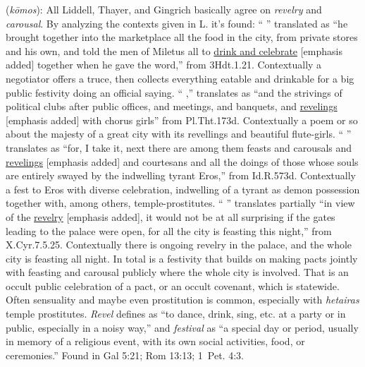 \item[Revel,]

(\textit{kōmos}):
All Liddell, Thayer, and Gingrich basically agree on \emph{revelry} and \emph{carousal}. By analyzing the contexts given in L. it's found: `` \underline{} '' translated as ``he brought together into the marketplace all the food in the city, from private stores and his own, and told the men of Miletus all to \underline{drink and celebrate} [emphasis added] together when he gave the word,'' from 3Hdt.1.21. Contextually a negotiator offers a truce, then collects everything eatable and drinkable for a big public festivity doing an official saying. `` \underline{},'' translates as ``and the strivings of political clubs after public offices, and meetings, and banquets, and \underline{revelings} [emphasis added] with chorus girls'' from Pl.Tht.173d. Contextually a poem or so about the majesty of a great city with its revellings and beautiful flute-girls. `` \underline{} '' translates as ``for, I take it, next there are among them feasts and carousals and \underline{revelings} [emphasis added] and courtesans and all the doings of those whose souls are entirely swayed by the indwelling tyrant Eros,'' from Id.R.573d. Contextually a fest to Eros with diverse celebration, indwelling of a tyrant as demon possession together with, among others, temple-prostitutes. ``\underline{} '' translates partially ``in view of the \underline{revelry} [emphasis added], it would not be at all surprising if the gates leading to the palace were open, for all the city is feasting this night,'' from X.Cyr.7.5.25. Contextually there is ongoing revelry in the palace, and the whole city is feasting all night. In total  is a festivity that builds on making pacts jointly with feasting and carousal publicly where the whole city is involved. That is an occult public celebration of a pact, or an occult covenant, which is statewide. Often sensuality and maybe even prostitution is common, especially with \emph{hetairas} temple prostitutes. \emph{Revel} defines as ``to dance, drink, sing, etc. at a party or in public, especially in a noisy way,'' and \emph{festival} as ``a special day or period, usually in memory of a religious event, with its own social activities, food, or ceremonies.''
Found in Gal 5:21; Rom 13:13; 1~Pet. 4:3.
